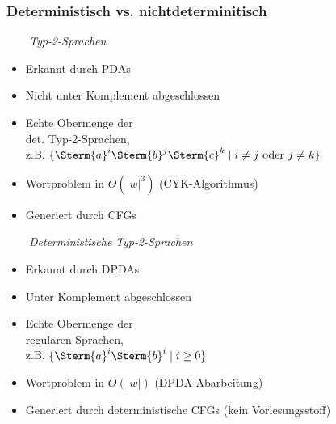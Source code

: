 \documentclass[aspectratio=1610,onlymath]{beamer}
\begin{document}
\begin{frame}\frametitle{Deterministisch vs. nichtdeterminitisch}

\begin{minipage}[t]{5.7cm}
~~~~\emph{Typ-2-Sprachen}\\
\begin{itemize}
\item Erkannt durch PDAs
\item Nicht unter Komplement abgeschlossen
\item Echte Obermenge der\\ det. Typ-2-Sprachen,\\ z.B. $\{\Sterm{a}^i\Sterm{b}^j\Sterm{c}^k\mid i\neq j \text{ oder }j\neq k\}$
\item Wortproblem in $O(|w|^3)$ (CYK-Algorithmus)
\item Generiert durch CFGs
\end{itemize}
\end{minipage}
\begin{minipage}[t]{5.7cm}
~~~~\emph{Deterministische} %
\emph{Typ-2-Sprachen}\\
\begin{itemize}
\item Erkannt durch DPDAs
\item Unter Komplement abgeschlossen
\item Echte Obermenge der\\ regulären Sprachen,\\ z.B. $\{\Sterm{a}^i\Sterm{b}^i\mid i\geq 0\}$
\item Wortproblem in $O(|w|)$ (DPDA-Abarbeitung)
\item Generiert durch deterministische CFGs (kein Vorlesungsstoff)
\end{itemize}
\end{minipage}

\end{frame}

\end{document}
